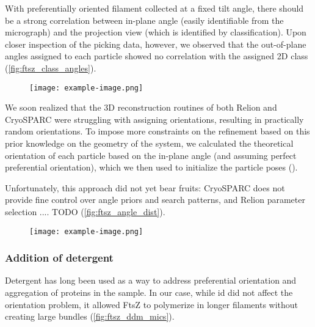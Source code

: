 With preferentially oriented filament collected at a fixed tilt angle, there should be a strong correlation between in-plane angle (easily identifiable from the micrograph) and the projection view (which is identified by classification). %
Upon closer inspection of the picking data, however, we observed that the out-of-plane angles assigned to each particle showed no correlation with the assigned 2D class (\autoref{fig:ftsz_class_angles}).

\begin{figure}[ht]
    \centering
    \texttt{[image: example-image.png]}
    \label{fig:ftsz_class_angles}
\end{figure}

We soon realized that the 3D reconstruction routines of both Relion and CryoSPARC were struggling with assigning orientations, resulting in practically random orientations.
To impose more constraints on the refinement based on this prior knowledge on the geometry of the system, we calculated the theoretical orientation of each particle based on the in-plane angle (and assuming perfect preferential orientation), which we then used to initialize the particle poses ().

Unfortunately, this approach did not yet bear fruits: CryoSPARC does not provide fine control over angle priors and search patterns, and Relion parameter selection .... TODO (\autoref{fig:ftsz_angle_dist}).

\begin{figure}[ht]
    \centering
    \texttt{[image: example-image.png]}
    \label{fig:ftsz_angle_dist}
\end{figure}

\subsubsection{Addition of detergent}

Detergent has long been used as a way to address preferential orientation and aggregation of proteins in the sample.
In our case, while id did not affect the orientation problem, it allowed FtsZ to polymerize in longer filaments without creating large bundles (\autoref{fig:ftsz_ddm_mics}).

